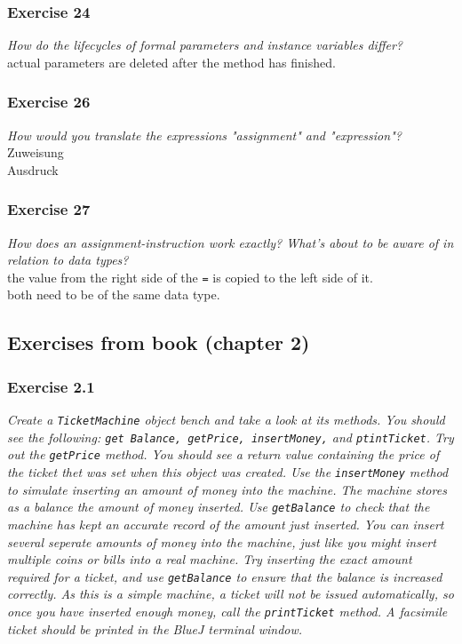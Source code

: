 \subsubsection*{Exercise 24}
\textit{How do the lifecycles of formal parameters and instance variables 
	differ?}\\
actual parameters are deleted after the method has finished. 

\subsubsection*{Exercise 26}
\textit{How would you translate the expressions "assignment" and 
	"expression"?}\\
Zuweisung \\
Ausdruck

\subsubsection*{Exercise 27}
\textit{How does an assignment-instruction work exactly? What's about to 
	be aware of in relation to data types?}\\
the value from the right side of the \verb?=? is copied to the left side of it. 
\\
both need to be of the same data type. 

\subsection{Exercises from book (chapter 2)}
\subsubsection*{Exercise 2.1}
\textit{Create a \verb?TicketMachine? object bench and take a look at its 
methods. You should see the following: 
\verb?get Balance, getPrice, insertMoney,? and \verb?ptintTicket?. Try out the 
\verb?getPrice? method. You should see a return value containing the price of 
the ticket thet was set when this object was created. Use the 
\verb?insertMoney? method to simulate inserting an amount of money into the 
machine. The machine stores as a balance the amount of money inserted. Use 
\verb?getBalance? to check that the machine has kept an accurate record of the 
amount just inserted. You can insert several seperate amounts of money into the 
machine, just like you might insert multiple coins or bills into a real 
machine. Try inserting the exact amount required for a ticket, and use 
\verb?getBalance? to ensure that the balance is increased correctly. As this 
is a simple machine, a ticket will not be issued automatically, so once you 
have inserted enough money, call the \verb?printTicket? method. A facsimile 
ticket should be printed in the BlueJ terminal window. }

